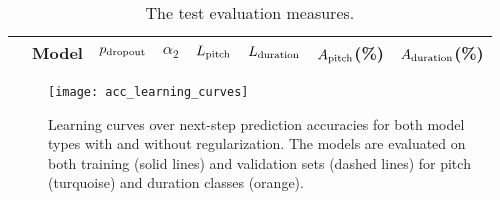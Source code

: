 \begin{table*}
    \centering
    \caption{
        The test evaluation measures.
    }
    \label{tab:test_eval}
    \begin{tabular}{
            l@{}
            S[table-format = 1.0]
            S[table-format = 0.2]
            S[table-format = 1.0]
            S[table-format = 1.3]
            S[table-format = 1.3]
            S[table-format = 2.2]
            S[table-format = 2.2]
        }
        \toprule
        & {Model} 
        & {$p_{\text{dropout}}$}
        & {$\alpha_2$}
        & {$L_{\text{pitch}}$}
        & {$L_{\text{duration}}$}
        & {$A_{\text{pitch}}$(\%)}
        & {$A_{\text{duration}}$(\%)} \\
        \midrule
        
        \bottomrule
    \end{tabular}
\end{table*}

\begin{figure*}
    \centering
    \texttt{[image: acc\_learning\_curves]}
	\hspace*{\fill}
    \caption{Learning curves over next-step prediction accuracies for both model types with and without regularization. The models are evaluated on both training (solid lines) and validation sets (dashed lines) for pitch (turquoise) and duration classes (orange).}
    \label{fig:learning_curves}
\end{figure*}


